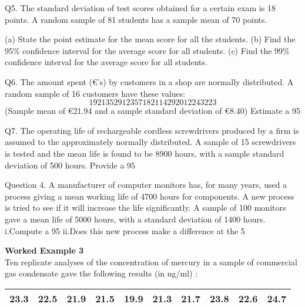 \newpage
Q5. The standard deviation of test scores obtained for a certain exam is 18 points. 
A random sample of 81 students has a sample mean of 70 points.

(a) State the point estimate for the mean score for all the students.
(b) Find the 95\% confidence interval for the average score for all students.
(c) Find the 99\% confidence interval for the average score for all students.

Q6. The amount spent (€’s) by customers in a shop are normally distributed. 
A random sample of 16 customers have these values:
\[19 21 35 29 12 35 7 18 21 14 29 20 12 24 32 23\]
(Sample  mean of €21.94 and a sample standard deviation of €8.40) 
Estimate a 95%

Q7. The operating life of rechargeable cordless screwdrivers produced by a firm is assumed to 
the approximately normally distributed. A sample of 15 screwdrivers is tested and the mean 
life is found to be 8900 hours, with a sample standard deviation of 500 hours. 
Provide a 95%


\newpage



Question 4.
A manufacturer of computer monitors  has, for many years, used a process giving a mean  working life of 4700 hours  for components.
A new process is tried to see if it will increase the life significantly. A sample of 100 monitors gave a mean life of 5000 hours, with a standard deviation of 1400 hours.
i.Compute a 95%
ii.Does this new process make a difference at the 5%


\item \textbf{Worked Example 3} \\ Ten replicate analyses of the concentration
of mercury in a sample of commercial gas condensate gave the
following results (in ng/ml) :

\begin{tabular}{|c|c|c|c|c|c|c|c|c|c|}
\hline
23.3 & 22.5 & 21.9 & 21.5 & 19.9 & 21.3 & 21.7 & 23.8 & 22.6 &
24.7\\
\hline
\end{tabular}



